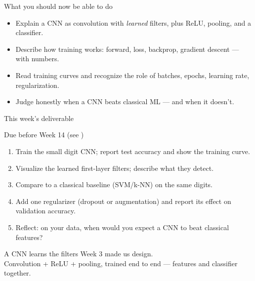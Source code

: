 \documentclass[10pt,aspectratio=169]{beamer}
\begin{document}
\begin{frame}{What you should now be able to do}
  \begin{itemize}
    \item Explain a CNN as convolution with \emph{learned} filters, plus ReLU, pooling, and a classifier.
    \item Describe how training works: forward, loss, backprop, gradient descent --- with numbers.
    \item Read training curves and recognize the role of batches, epochs, learning rate, regularization.
    \item Judge honestly when a CNN beats classical ML --- and when it doesn't.
  \end{itemize}
\end{frame}

\begin{frame}{This week's deliverable}
  \begin{alertblock}{Due before Week 14 (see )}
    \begin{enumerate}
      \item Train the small digit CNN; report test accuracy and show the training curve.
      \item Visualize the learned first-layer filters; describe what they detect.
      \item Compare to a classical baseline (SVM/k-NN) on the same digits.
      \item Add one regularizer (dropout or augmentation) and report its effect on validation accuracy.
      \item Reflect: on your data, when would you expect a CNN to beat classical features?
    \end{enumerate}
  \end{alertblock}
\end{frame}

\begin{frame}[standout]
  A CNN learns the filters Week 3 made us design.\\[4pt]
  \normalsize Convolution + ReLU + pooling, trained end to end --- features and classifier together.
\end{frame}
\end{document}
